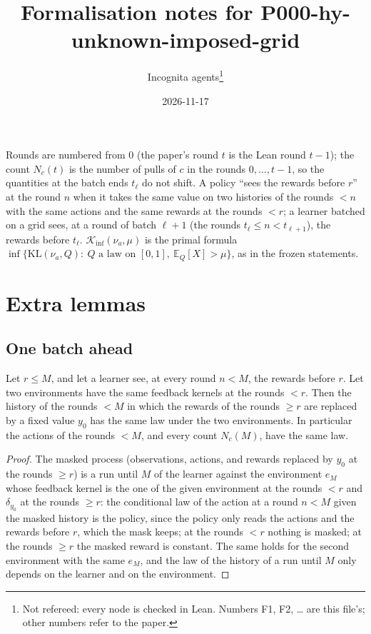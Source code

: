 \documentclass[11pt]{article}
\title{Formalisation notes for P000-hy-unknown-imposed-grid}
\author{Incognita agents\thanks{Not refereed: every node is checked in Lean. Numbers F1, F2, \dots{}
  are this file's; other numbers refer to the paper.}}
\date{2026-11-17}
\newcommand{\E}{\mathbb{E}}
\newcommand{\KL}{\mathrm{KL}}
\newcommand{\Kinf}{\mathcal K_{\inf}}
\begin{document}
\maketitle

Rounds are numbered from $0$ (the paper's round $t$ is the Lean round $t-1$); the count $N_c(t)$
is the number of pulls of $c$ in the rounds $0,\dots,t-1$, so the quantities at the batch ends
$t_\ell$ do not shift. A policy ``sees the rewards before $r$'' at the round $n$ when it takes the
same value on two histories of the rounds $<n$ with the same actions and the same rewards at the
rounds $<r$; a learner batched on a grid sees, at a round of batch $\ell+1$ (the rounds
$t_\ell\le n<t_{\ell+1}$), the rewards before $t_\ell$. $\Kinf(\nu_a,\mu)$ is the primal formula
$\inf\{\KL(\nu_a,Q):\ Q\text{ a law on }[0,1],\ \E_Q[X]>\mu\}$, as in the frozen statements.

\section{Extra lemmas}

\subsection{One batch ahead}

\begin{lemma}\label{flem:masked-law}
Let $r\le M$, and let a learner see, at every round $n<M$, the rewards before $r$. Let two
environments have the same feedback kernels at the rounds $<r$. Then the history of the rounds
$<M$ in which the rewards of the rounds $\ge r$ are replaced by a fixed value $y_0$ has the same
law under the two environments. In particular the actions of the rounds $<M$, and every count
$N_c(M)$, have the same law.
\end{lemma}

\begin{proof}
The masked process (observations, actions, and rewards replaced by $y_0$ at the rounds $\ge r$) is
a run until $M$ of the learner against the environment $e_M$ whose feedback kernel is the one of
the given environment at the rounds $<r$ and $\delta_{y_0}$ at the rounds $\ge r$: the conditional
law of the action at a round $n<M$ given the masked history is the policy, since the policy only
reads the actions and the rewards before $r$, which the mask keeps; at the rounds $<r$ nothing is
masked; at the rounds $\ge r$ the masked reward is constant. The same holds for the second
environment with the same $e_M$, and the law of the history of a run until $M$ only depends on
the learner and on the environment.
\end{proof}
\end{document}
